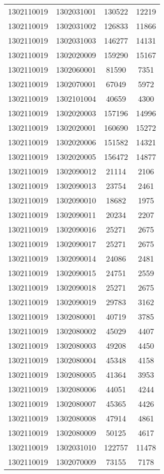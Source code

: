 \begin{longtable}{llcc}
1302110019 & 1302031001 & 130522 & 12219\\
1302110019 & 1302031002 & 126833 & 11866\\
1302110019 & 1302031003 & 146277 & 14131\\
1302110019 & 1302020009 & 159290 & 15167\\
1302110019 & 1302060001 & 81590 & 7351\\
1302110019 & 1302070001 & 67049 & 5972\\
1302110019 & 1302101004 & 40659 & 4300\\
1302110019 & 1302020003 & 157196 & 14996\\
1302110019 & 1302020001 & 160690 & 15272\\
1302110019 & 1302020006 & 151582 & 14321\\
1302110019 & 1302020005 & 156472 & 14877\\
1302110019 & 1302090012 & 21114 & 2106\\
1302110019 & 1302090013 & 23754 & 2461\\
1302110019 & 1302090010 & 18682 & 1975\\
1302110019 & 1302090011 & 20234 & 2207\\
1302110019 & 1302090016 & 25271 & 2675\\
1302110019 & 1302090017 & 25271 & 2675\\
1302110019 & 1302090014 & 24086 & 2481\\
1302110019 & 1302090015 & 24751 & 2559\\
1302110019 & 1302090018 & 25271 & 2675\\
1302110019 & 1302090019 & 29783 & 3162\\
1302110019 & 1302080001 & 40719 & 3785\\
1302110019 & 1302080002 & 45029 & 4407\\
1302110019 & 1302080003 & 49208 & 4450\\
1302110019 & 1302080004 & 45348 & 4158\\
1302110019 & 1302080005 & 41364 & 3953\\
1302110019 & 1302080006 & 44051 & 4244\\
1302110019 & 1302080007 & 45365 & 4426\\
1302110019 & 1302080008 & 47914 & 4861\\
1302110019 & 1302080009 & 50125 & 4617\\
1302110019 & 1302031010 & 122757 & 11478\\
1302110019 & 1302070009 & 73155 & 7178\\

\end{longtable}
